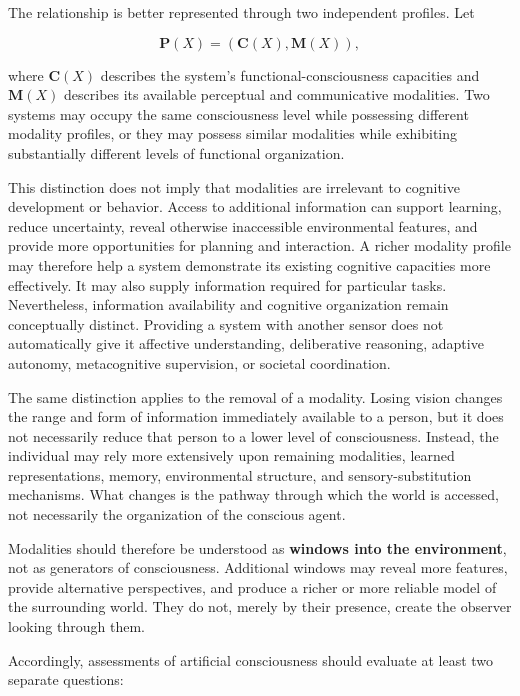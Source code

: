 The relationship is better represented through two independent profiles. Let

\begin{equation}\label{eq19}
\mathbf{P}(X)
=
\left(
\mathbf{C}(X),
\mathbf{M}(X)
\right),
\end{equation}

where \(\mathbf{C}(X)\) describes the system's functional-consciousness capacities and \(\mathbf{M}(X)\) describes its available perceptual and communicative modalities. Two systems may occupy the same consciousness level while possessing different modality profiles, or they may possess similar modalities while exhibiting substantially different levels of functional organization.

This distinction does not imply that modalities are irrelevant to cognitive development or behavior. Access to additional information can support learning, reduce uncertainty, reveal otherwise inaccessible environmental features, and provide more opportunities for planning and interaction. A richer modality profile may therefore help a system demonstrate its existing cognitive capacities more effectively. It may also supply information required for particular tasks. Nevertheless, information availability and cognitive organization remain conceptually distinct. Providing a system with another sensor does not automatically give it affective understanding, deliberative reasoning, adaptive autonomy, metacognitive supervision, or societal coordination.

The same distinction applies to the removal of a modality. Losing vision changes the range and form of information immediately available to a person, but it does not necessarily reduce that person to a lower level of consciousness. Instead, the individual may rely more extensively upon remaining modalities, learned representations, memory, environmental structure, and sensory-substitution mechanisms. What changes is the pathway through which the world is accessed, not necessarily the organization of the conscious agent.

Modalities should therefore be understood as \textbf{windows into the environment}, not as generators of consciousness. Additional windows may reveal more features, provide alternative perspectives, and produce a richer or more reliable model of the surrounding world. They do not, merely by their presence, create the observer looking through them.

Accordingly, assessments of artificial consciousness should evaluate at least two separate questions:

